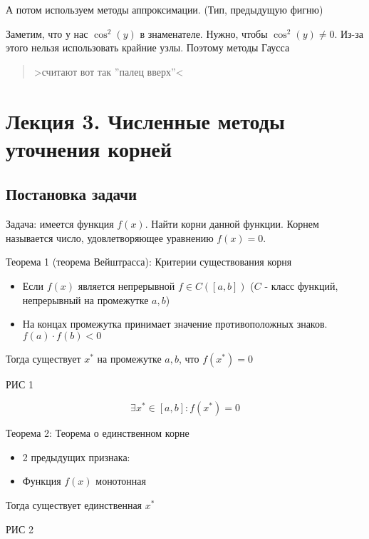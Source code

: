 \documentclass[12pt]{article}
\begin{document}
А потом используем методы аппроксимации. (Тип, предыдущую фигню)

Заметим, что у нас \( \cos^2(y) \) в знаменателе.
Нужно, чтобы \( \cos^2(y) \neq 0 \). Из-за этого нельзя использовать крайние узлы.
Поэтому методы Гаусса

\begin{quotation}
  \centering
  >считают вот так ''палец вверх''<
\end{quotation}


\newpage

\section{Лекция 3. Численные методы уточнения корней}
\subsection{Постановка задачи}

Задача: имеется функция \( f(x) \). Найти корни данной функции. \newline
Корнем называется число, удовлетворяющее уравнению \( f(x) = 0 \).

\vspace{20pt}

Теорема 1 (теорема Вейштрасса): Критерии существования корня
\begin{itemize}
  \item Если \( f(x) \) является непрерывной \( f \in C([a, b]) \)
        (\( C \) - класс функций, непрерывный на промежутке \( a, b \))
  \item На концах промежутка принимает значение противоположных знаков.
        \( f(a) \cdot f(b) < 0 \)
\end{itemize}
Тогда существует \( x^{*} \) на промежутке \( a, b \), что \( f(x^{*}) = 0 \)

РИС 1

\[
  \exists x^{*} \in [a, b] : f(x^{*}) = 0
\] 

Теорема 2: Теорема о единственном корне
\begin{itemize}
  \item 2 предыдущих признака:
  \item Функция \( f(x) \) монотонная
\end{itemize}
Тогда существует единственная \( x^{*} \)

РИС 2
\end{document}
